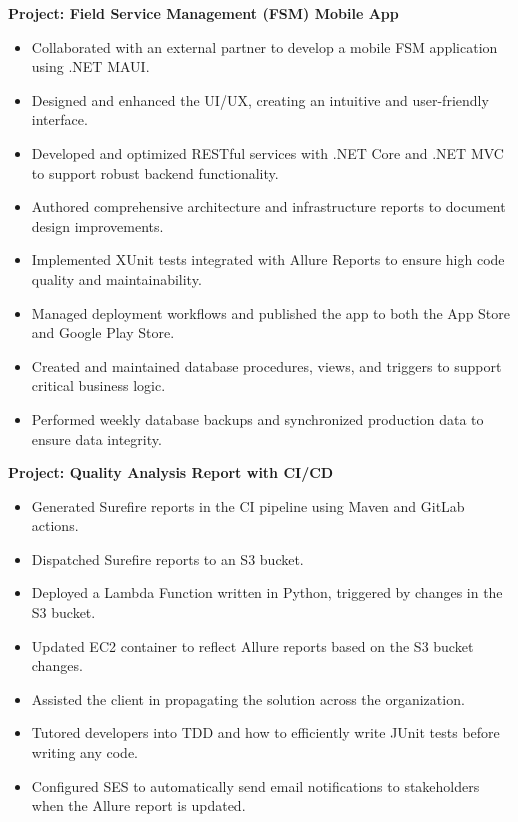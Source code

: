\documentclass[10pt,a4paper]{altacv}
\begin{document}
\textbf{Project: Field Service Management (FSM) Mobile App}
\begin{itemize}
    \setlength{\itemindent}{0.5em}
    \item[--] Collaborated with an external partner to develop a mobile FSM application using .NET MAUI.
    \item[--] Designed and enhanced the UI/UX, creating an intuitive and user-friendly interface.
    \item[--] Developed and optimized RESTful services with .NET Core and .NET MVC to support robust backend functionality.
    
    \break
\newpage
{}

    \item[--] Authored comprehensive architecture and infrastructure reports to document design improvements.
    \item[--] Implemented XUnit tests integrated with Allure Reports to ensure high code quality and maintainability.
    \item[--] Managed deployment workflows and published the app to both the App Store and Google Play Store.
    \item[--] Created and maintained database procedures, views, and triggers to support critical business logic.
    \item[--] Performed weekly database backups and synchronized production data to ensure data integrity.
\end{itemize}



\textbf{Project: Quality Analysis Report with CI/CD}
\begin{itemize}
    \setlength{\itemindent}{0.5em}
    \item[--] Generated Surefire reports in the CI pipeline using Maven and GitLab actions.
    \item[--] Dispatched Surefire reports to an S3 bucket.
    \item[--] Deployed a Lambda Function written in Python, triggered by changes in the S3 bucket.
    \item[--] Updated EC2 container to reflect Allure reports based on the S3 bucket changes.
    \item[--] Assisted the client in propagating the solution across the organization.
    \item[--] Tutored developers into TDD and how to efficiently write JUnit tests before writing any code.
    \item[--] Configured SES to automatically send email notifications to stakeholders when the Allure report is updated.
\end{itemize}
\end{document}
